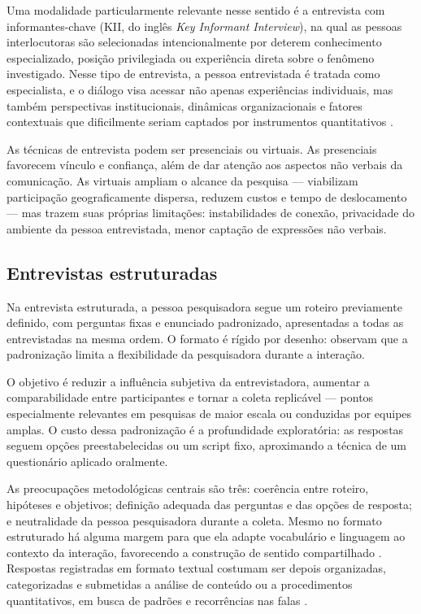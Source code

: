 \documentclass[12pt, a4paper, openany]{book}
\begin{document}
Uma modalidade particularmente relevante nesse sentido \'e a entrevista com informantes-chave (KII, do ingl\^es \textit{Key Informant Interview}), na qual as pessoas interlocutoras s\~ao selecionadas intencionalmente por deterem conhecimento especializado, posi\c{c}\~ao privilegiada ou experi\^encia direta sobre o fen\^omeno investigado. Nesse tipo de entrevista, a pessoa entrevistada \'e tratada como especialista, e o di\'alogo visa acessar n\~ao apenas experi\^encias individuais, mas tamb\'em perspectivas institucionais, din\^amicas organizacionais e fatores contextuais que dificilmente seriam captados por instrumentos quantitativos \citep{bryman2012social,neuman2014social}.

As t\'ecnicas de entrevista podem ser presenciais ou virtuais. As presenciais favorecem v\'inculo e confian\c{c}a, al\'em de dar aten\c{c}\~ao aos aspectos n\~ao verbais da comunica\c{c}\~ao. As virtuais ampliam o alcance da pesquisa --- viabilizam participa\c{c}\~ao geograficamente dispersa, reduzem custos e tempo de deslocamento --- mas trazem suas pr\'oprias limita\c{c}\~oes: instabilidades de conex\~ao, privacidade do ambiente da pessoa entrevistada, menor capta\c{c}\~ao de express\~oes n\~ao verbais.

\subsection{Entrevistas estruturadas}

Na entrevista estruturada, a pessoa pesquisadora segue um roteiro previamente definido, com perguntas fixas e enunciado padronizado, apresentadas a todas as entrevistadas na mesma ordem. O formato \'e r\'igido por desenho: \citet{silva2019aplicacao} observam que a padroniza\c{c}\~ao limita a flexibilidade da pesquisadora durante a intera\c{c}\~ao.

O objetivo \'e reduzir a influ\^encia subjetiva da entrevistadora, aumentar a comparabilidade entre participantes e tornar a coleta replic\'avel --- pontos especialmente relevantes em pesquisas de maior escala ou conduzidas por equipes amplas. O custo dessa padroniza\c{c}\~ao \'e a profundidade explorat\'oria: as respostas seguem op\c{c}\~oes preestabelecidas ou um script fixo, aproximando a t\'ecnica de um question\'ario aplicado oralmente.

As preocupa\c{c}\~oes metodol\'ogicas centrais s\~ao tr\^es: coer\^encia entre roteiro, hip\'oteses e objetivos; defini\c{c}\~ao adequada das perguntas e das op\c{c}\~oes de resposta; e neutralidade da pessoa pesquisadora durante a coleta. Mesmo no formato estruturado h\'a alguma margem para que ela adapte vocabul\'ario e linguagem ao contexto da intera\c{c}\~ao, favorecendo a constru\c{c}\~ao de sentido compartilhado \citep{silva2006entrevista}. Respostas registradas em formato textual costumam ser depois organizadas, categorizadas e submetidas a an\'alise de conte\'udo ou a procedimentos quantitativos, em busca de padr\~oes e recorr\^encias nas falas \citep{fraser2004fala}.
\end{document}
